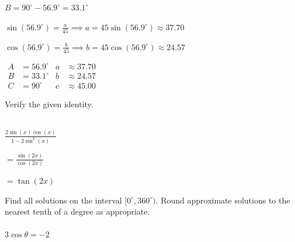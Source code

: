 \documentclass[11pt]{exam}
\begin{document}
\begin{questions}
\begin{solution}
\(B = 90^\circ - 56.9^\circ = 33.1^\circ\)

\(\sin(56.9^\circ) = \frac{a}{45} \implies a = 45\sin(56.9^\circ) \approx 37.70\)

\(\cos(56.9^\circ) = \frac{b}{45} \implies b = 45\cos(56.9^\circ) \approx 24.57\)

\(\boxed{\begin{aligned} A &= 56.9^\circ & a &\approx 37.70 \\ B &= 33.1^\circ & b &\approx 24.57 \\ C &= 90^\circ & c &\approx 45.00 \end{aligned}}\)
\end{solution}

\newpage

\question[5] Verify the given identity.\\ \\
\begin{solution}
\(\frac{2\sin(x)\cos(x)}{1 - 2\sin^2(x)}\)

\(= \frac{\sin(2x)}{\cos(2x)}\)

\(= \boxed{\tan(2x)}\)
\end{solution}

\newpage

\question[5] Find all solutions on the interval $[0^\circ,360^\circ)$. Round approximate solutions to the nearest tenth of a degree as appropriate.\\ \\
\(3 \cos \theta = -2\)


\end{questions}
\end{document}
